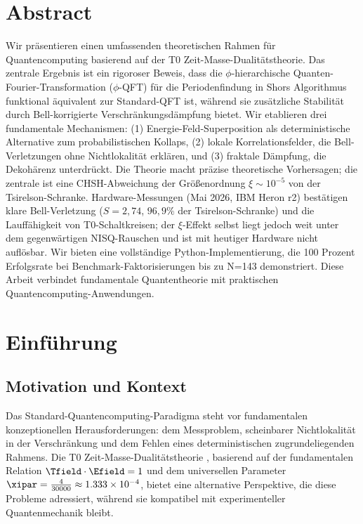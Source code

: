 \section*{Abstract}
Wir präsentieren einen umfassenden theoretischen Rahmen für Quantencomputing basierend auf der T0 Zeit-Masse-Dualitätstheorie. Das zentrale Ergebnis ist ein rigoroser Beweis, dass die $\phi$-hierarchische Quanten-Fourier-Transformation ($\phi$-QFT) für die Periodenfindung in Shors Algorithmus funktional äquivalent zur Standard-QFT ist, während sie zusätzliche Stabilität durch Bell-korrigierte Verschränkungsdämpfung bietet. Wir etablieren drei fundamentale Mechanismen: (1) Energie-Feld-Superposition als deterministische Alternative zum probabilistischen Kollaps, (2) lokale Korrelationsfelder, die Bell-Verletzungen ohne Nichtlokalität erklären, und (3) fraktale Dämpfung, die Dekohärenz unterdrückt. Die Theorie macht präzise theoretische Vorhersagen; die zentrale ist eine CHSH-Abweichung der Größenordnung $\xi \sim 10^{-5}$ von der Tsirelson-Schranke. Hardware-Messungen (Mai 2026, IBM Heron r2) bestätigen klare Bell-Verletzung ($S = 2{,}74$, $96{,}9\%$ der Tsirelson-Schranke) und die Lauffähigkeit von T0-Schaltkreisen; der $\xi$-Effekt selbst liegt jedoch weit unter dem gegenwärtigen NISQ-Rauschen und ist mit heutiger Hardware nicht auflösbar. Wir bieten eine vollständige Python-Implementierung, die 100 Prozent Erfolgsrate bei Benchmark-Faktorisierungen bis zu N=143 demonstriert. Diese Arbeit verbindet fundamentale Quantentheorie mit praktischen Quantencomputing-Anwendungen.


\clearpage

\section{Einführung}

\subsection{Motivation und Kontext}

Das Standard-Quantencomputing-Paradigma steht vor fundamentalen konzeptionellen Herausforderungen: dem Messproblem, scheinbarer Nichtlokalität in der Verschränkung und dem Fehlen eines deterministischen zugrundeliegenden Rahmens. Die T0 Zeit-Masse-Dualitätstheorie \cite{pascher_t0_2025}, basierend auf der fundamentalen Relation $\Tfield \cdot \Efield = 1$ und dem universellen Parameter $\xipar = \frac{4}{30000} \approx 1.333 \times 10^{-4}$, bietet eine alternative Perspektive, die diese Probleme adressiert, während sie kompatibel mit experimenteller Quantenmechanik bleibt.

